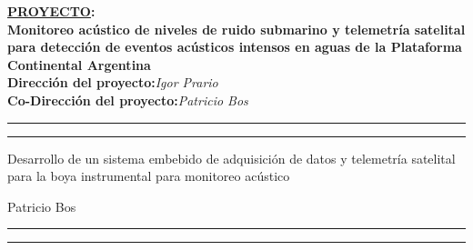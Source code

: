 \thispagestyle{empty}


	\noindent
	\begin{minipage}[c][50mm][c]{1.0\linewidth} 
		\begin{center}
			\Large{\textbf{\underline{PROYECTO}:\\
			Monitoreo acústico de niveles de ruido submarino y telemetría satelital para detección de eventos acústicos intensos en aguas de la Plataforma
			Continental Argentina}}\\
			\vspace{2mm}		
			\textbf{Dirección del proyecto:}\hspace{2pc}\textit{Igor Prario}\\
			\textbf{Co-Dirección del proyecto:}\hspace{2pc}\textit{Patricio Bos}\\
		\end{center}
	\end{minipage}
	\vspace{1mm}


	\noindent
	\begin{minipage}[c][70mm][c]{1.0\linewidth} 
		{\hrule\hrule}
 		\vspace{5mm}
		\begin{flushleft}
			\huge{Desarrollo de un sistema embebido de adquisición de datos y telemetría satelital para la boya instrumental para monitoreo acústico}
		\end{flushleft}
		\vspace{8mm}
		\begin{flushright}
			\Large{Patricio Bos}\\
		\end{flushright}
		\vspace{2mm}
		{\hrule\hrule}
	\end{minipage}
	\vspace{-5mm}

